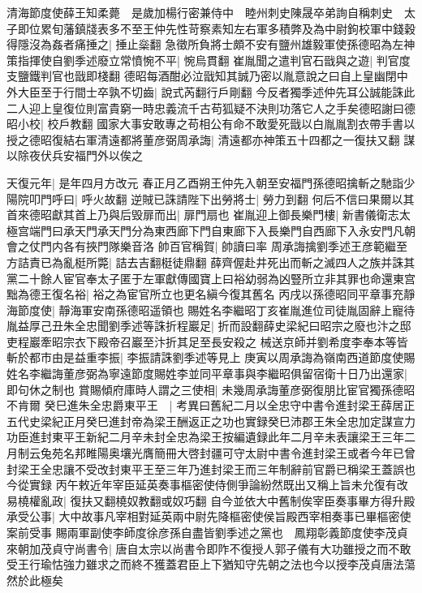 清海節度使薛王知柔薨　是歲加楊行密兼侍中　睦州刺史陳晟卒弟詢自稱刺史　太子即位累旬藩鎮牋表多不至王仲先性苛察素知左右軍多積弊及為中尉鉤校軍中錢穀得隱沒為姦者痛捶之|{
	捶止橤翻}
急徵所負將士頗不安有鹽州雄毅軍使孫德昭為左神策指揮使自劉季述廢立常憤惋不平|{
	惋烏貫翻}
崔胤聞之遣判官石戩與之遊|{
	判官度支鹽鐵判官也戩即棧翻}
德昭每酒酣必泣戩知其誠乃密以胤意說之曰自上皇幽閉中外大臣至于行間士卒孰不切齒|{
	說式芮翻行戶剛翻}
今反者獨季述仲先耳公誠能誅此二人迎上皇復位則富貴窮一時忠義流千古苟狐疑不決則功落它人之手矣德昭謝曰德昭小校|{
	校戶教翻}
國家大事安敢專之苟相公有命不敢愛死戩以白胤胤割衣帶手書以授之德昭復結右軍清遠都將董彦弼周承誨|{
	清遠都亦神策五十四都之一復扶又翻}
謀以除夜伏兵安福門外以俟之

天復元年|{
	是年四月方改元}
春正月乙酉朔王仲先入朝至安福門孫德昭擒斬之馳詣少陽院叩門呼曰|{
	呼火故翻}
逆賊已誅請陛下出勞將士|{
	勞力到翻}
何后不信曰果爾以其首來德昭獻其首上乃與后毁扉而出|{
	扉門扇也}
崔胤迎上御長樂門樓|{
	新書儀衛志太極宫端門曰承天門承天門分為東西廊下門自東廊下入長樂門自西廊下入永安門凡朝會之仗門内各有挾門隊樂音洛}
帥百官稱賀|{
	帥讀曰率}
周承誨擒劉季述王彦範繼至方詰責已為亂梃所斃|{
	詰去吉翻梃徒鼎翻}
薛齊偓赴井死出而斬之滅四人之族并誅其黨二十餘人宦官奉太子匿于左軍獻傳國寶上曰裕幼弱為凶豎所立非其罪也命還東宫黜為德王復名裕|{
	裕之為宦官所立也更名縝今復其舊名}
丙戌以孫德昭同平章事充靜海節度使|{
	靜海軍安南孫德昭遥領也}
賜姓名李繼昭丁亥崔胤進位司徒胤固辭上寵待胤益厚己丑朱全忠聞劉季述等誅折程巖足|{
	折而設翻薛史梁紀曰昭宗之廢也汴之邸吏程巖牽昭宗衣下殿帝召巖至汴折其足至長安殺之}
械送京師并劉希度李奉本等皆斬於都市由是益重李振|{
	李振請誅劉季述等見上}
庚寅以周承誨為嶺南西道節度使賜姓名李繼誨董彦弼為寧遠節度賜姓李並同平章事與李繼昭俱留宿衛十日乃出還家|{
	即句休之制也}
賞賜傾府庫時人謂之三使相|{
	未幾周承誨董彦弼復朋比宦官獨孫德昭不肯爾}
癸巳進朱全忠爵東平王　|{
	考異曰舊紀二月以全忠守中書令進封梁王薛居正五代史梁紀正月癸巳進封帝為梁王酬返正之功也實録癸巳沛郡王朱全忠加定謀宣力功臣進封東平王新紀二月辛未封全忠為梁王按編遺録此年二月辛未表讓梁王三年二月制云兔苑名邦睢陽奥壤光膺簡冊大啓封疆可守太尉中書令進封梁王或者今年已曾封梁王全忠讓不受改封東平王至三年乃進封梁王而三年制辭前官爵已稱梁王蓋誤也今從實録}
丙午敕近年宰臣延英奏事樞密使侍側爭論紛然既出又稱上旨未允復有改易橈權亂政|{
	復扶又翻橈奴教翻或奴巧翻}
自今並依大中舊制俟宰臣奏事畢方得升殿承受公事|{
	大中故事凡宰相對延英兩中尉先降樞密使侯旨殿西宰相奏事已畢樞密使案前受事}
賜兩軍副使李師度徐彦孫自盡皆劉季述之黨也　鳳翔彰義節度使李茂貞來朝加茂貞守尚書令|{
	唐自太宗以尚書令即阼不復授人郭子儀有大功雖授之而不敢受王行瑜怙強力雖求之而終不獲蓋君臣上下猶知守先朝之法也今以授李茂貞唐法蕩然於此極矣}
